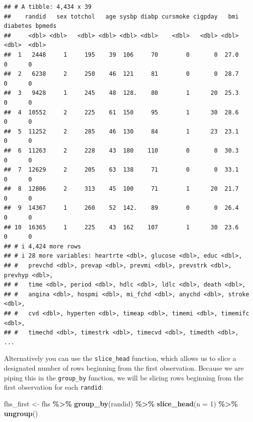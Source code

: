 \documentclass[
]{book}
\newenvironment{Shaded}{\begin{snugshade}}{\end{snugshade}}
\newcommand{\AttributeTok}[1]{\textcolor[rgb]{0.13,0.29,0.53}{#1}}
\newcommand{\DecValTok}[1]{\textcolor[rgb]{0.00,0.00,0.81}{#1}}
\newcommand{\FunctionTok}[1]{\textcolor[rgb]{0.13,0.29,0.53}{\textbf{#1}}}
\newcommand{\NormalTok}[1]{#1}
\newcommand{\OtherTok}[1]{\textcolor[rgb]{0.56,0.35,0.01}{#1}}
\newcommand{\SpecialCharTok}[1]{\textcolor[rgb]{0.81,0.36,0.00}{\textbf{#1}}}
\begin{document}
\begin{verbatim}
## # A tibble: 4,434 x 39
##    randid   sex totchol   age sysbp diabp cursmoke cigpday   bmi diabetes bpmeds
##     <dbl> <dbl>   <dbl> <dbl> <dbl> <dbl>    <dbl>   <dbl> <dbl>    <dbl>  <dbl>
##  1   2448     1     195    39  106     70        0       0  27.0        0      0
##  2   6238     2     250    46  121     81        0       0  28.7        0      0
##  3   9428     1     245    48  128.    80        1      20  25.3        0      0
##  4  10552     2     225    61  150     95        1      30  28.6        0      0
##  5  11252     2     285    46  130     84        1      23  23.1        0      0
##  6  11263     2     228    43  180    110        0       0  30.3        0      0
##  7  12629     2     205    63  138     71        0       0  33.1        0      0
##  8  12806     2     313    45  100     71        1      20  21.7        0      0
##  9  14367     1     260    52  142.    89        0       0  26.4        0      0
## 10  16365     1     225    43  162    107        1      30  23.6        0      0
## # i 4,424 more rows
## # i 28 more variables: heartrte <dbl>, glucose <dbl>, educ <dbl>,
## #   prevchd <dbl>, prevap <dbl>, prevmi <dbl>, prevstrk <dbl>, prevhyp <dbl>,
## #   time <dbl>, period <dbl>, hdlc <dbl>, ldlc <dbl>, death <dbl>,
## #   angina <dbl>, hospmi <dbl>, mi_fchd <dbl>, anychd <dbl>, stroke <dbl>,
## #   cvd <dbl>, hyperten <dbl>, timeap <dbl>, timemi <dbl>, timemifc <dbl>,
## #   timechd <dbl>, timestrk <dbl>, timecvd <dbl>, timedth <dbl>, ...
\end{verbatim}

Alternatively you can use the \texttt{slice\_head} function, which allows us to slice a designated number of rows beginning from the first observation. Because we are piping this in the \texttt{group\_by} function, we will be slicing rows beginning from the first observation for each \texttt{randid}:

\begin{Shaded}
\begin{Highlighting}[]
\NormalTok{fhs\_first }\OtherTok{\textless{}{-}}\NormalTok{ fhs }\SpecialCharTok{\%\textgreater{}\%} 
  \FunctionTok{group\_by}\NormalTok{(randid) }\SpecialCharTok{\%\textgreater{}\%} 
  \FunctionTok{slice\_head}\NormalTok{(}\AttributeTok{n =} \DecValTok{1}\NormalTok{) }\SpecialCharTok{\%\textgreater{}\%} 
  \FunctionTok{ungroup}\NormalTok{()}
\end{Highlighting}
\end{Shaded}
\end{document}
